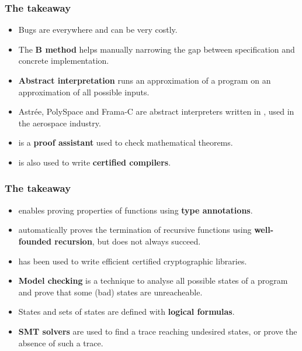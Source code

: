 \documentclass[compress,dvipdfmx]{beamer}
\begin{document}
\begin{frame}
  \frametitle{The takeaway}

  \begin{itemize}

    \item Bugs are everywhere and can be very costly.

    \item The \textbf{B method} helps manually narrowing the gap
      between specification and concrete implementation.

    \item \textbf{Abstract interpretation} runs an approximation of a
      program on an approximation of all possible inputs.

    \item Astrée, PolySpace and Frama-C are abstract interpreters
      written in \OCaml, used in the aerospace industry.

    \item \Coq is a \textbf{proof assistant} used to check
      mathematical theorems.

    \item \Coq is also used to write \textbf{certified compilers}.

  \end{itemize}

\end{frame}

\begin{frame}
  \frametitle{The takeaway}

  \begin{itemize}

    \item \Fstar enables proving properties of functions using
      \textbf{type annotations}.

    \item \Fstar automatically proves the termination of recursive
      functions using \textbf{well-founded recursion}, but does not
      always succeed.

    \item \Fstar has been used to write efficient certified
      cryptographic libraries.

    \item \textbf{Model checking} is a technique to analyse all
      possible states of a program and prove that some (bad) states
      are unreacheable.

    \item States and sets of states are defined with \textbf{logical
      formulas}.

    \item \textbf{SMT solvers} are used to find a trace reaching
      undesired states, or prove the absence of such a trace.


  \end{itemize}

\end{frame}
\end{document}
